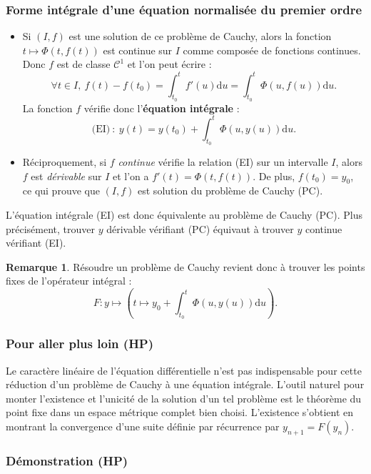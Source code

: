 \documentclass[french]{article}
\renewcommand{\d}{\text{d}}
\theoremstyle{plain}
\theoremstyle{definition}
\newtheorem*{rmq}{Remarque}
\theoremstyle{remark}
\begin{document}
\subsubsection*{Forme intégrale d'une équation normalisée du premier ordre}

\begin{itemize}
	\item Si $(I,f)$ est une solution de ce problème de Cauchy, alors la fonction $t\mapsto\Phi(t,f(t))$ est continue sur $I$ comme composée de fonctions continues. Donc $f$ est de classe $\mathcal{C}^1$ et l'on peut écrire :
	$$\forall t\in I,\ f(t)-f(t_0)=\int_{t_0}^{t}f'(u)\d u=\int_{t_0}^{t}\Phi(u,f(u))\d u.$$
	La fonction $f$ vérifie donc l'\textbf{équation intégrale} :
	$$\text{(EI)}\ :\ y(t)=y(t_0)+\int_{t_0}^{t}\Phi(u,y(u))\d u.$$
	\item Réciproquement, si $f$ \textit{continue} vérifie la relation (EI) sur un intervalle $I$, alors $f$ est \textit{dérivable} sur $I$ et l'on a $f'(t)=\Phi(t,f(t))$. De plus, $f(t_0)=y_0$, ce qui prouve que $(I,f)$ est solution du problème de Cauchy (PC).
\end{itemize}

L'équation intégrale (EI) est donc équivalente au problème de Cauchy (PC). Plus précisément, trouver $y$ dérivable vérifiant (PC) équivaut à trouver $y$ continue vérifiant (EI).

\begin{rmq}
	Résoudre un problème de Cauchy revient donc à trouver les points fixes de l'opérateur intégral :
	$$F:y\mapsto\left(t\mapsto y_0+\int_{t_0}^{t}\Phi(u,y(u))\d u\right).$$
\end{rmq}

\subsubsection*{Pour aller plus loin (HP)}

Le caractère linéaire de l'équation différentielle n'est pas indispensable pour cette réduction d'un problème de Cauchy à une équation intégrale. L'outil naturel pour monter l'existence et l'unicité de la solution d'un tel problème est le théorème du point fixe dans un espace métrique complet bien choisi. L'existence s'obtient en montrant la convergence d'une suite définie par récurrence par $y_{n+1}=F(y_n)$.

\subsubsection*{Démonstration (HP)}
\end{document}
